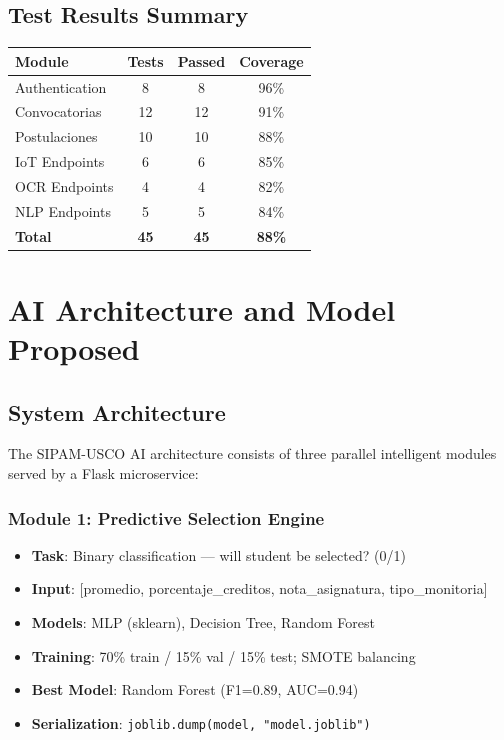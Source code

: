 \documentclass[12pt,a4paper]{report}
\begin{document}
\section{Test Results Summary}
\begin{center}
\begin{tabular}{|l|c|c|c|}
\hline
\textbf{Module} & \textbf{Tests} & \textbf{Passed} & \textbf{Coverage} \\
\hline
Authentication & 8 & 8 & 96\% \\
\hline
Convocatorias & 12 & 12 & 91\% \\
\hline
Postulaciones & 10 & 10 & 88\% \\
\hline
IoT Endpoints & 6 & 6 & 85\% \\
\hline
OCR Endpoints & 4 & 4 & 82\% \\
\hline
NLP Endpoints & 5 & 5 & 84\% \\
\hline
\textbf{Total} & \textbf{45} & \textbf{45} & \textbf{88\%} \\
\hline
\end{tabular}
\end{center}

\chapter{AI Architecture and Model Proposed}

\section{System Architecture}

The SIPAM-USCO AI architecture consists of three parallel intelligent modules served by a Flask microservice:

\subsection{Module 1: Predictive Selection Engine}
\begin{itemize}
    \item \textbf{Task}: Binary classification — will student be selected? (0/1)
    \item \textbf{Input}: [promedio, porcentaje\_creditos, nota\_asignatura, tipo\_monitoria]
    \item \textbf{Models}: MLP (sklearn), Decision Tree, Random Forest
    \item \textbf{Training}: 70\% train / 15\% val / 15\% test; SMOTE balancing
    \item \textbf{Best Model}: Random Forest (F1=0.89, AUC=0.94)
    \item \textbf{Serialization}: \texttt{joblib.dump(model, "model.joblib")}
\end{itemize}
\end{document}

